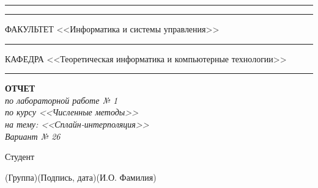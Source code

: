 \documentclass[14pt, russian]{scrartcl}
\begin{document}
\begin{titlepage}
	\vspace{-2pt}
	\hspace{-34.5pt}\rule{\textwidth}{2.5pt}

	\vspace*{-20.3pt}
	\hspace{-34.5pt}\rule{\textwidth}{0.4pt}

	\vspace{0.5ex}
	\noindent \small ФАКУЛЬТЕТ\hspace{80pt} <<Информатика и системы управления>>

	\vspace*{-16pt}
	\hspace{35pt}\rule{0.855\textwidth}{0.4pt}

	\vspace{0.5ex}
	\noindent \small КАФЕДРА\hspace{50pt} <<Теоретическая информатика и компьютерные технологии>>

	\vspace*{-16pt}
	\hspace{25pt}\rule{0.875\textwidth}{0.4pt}


	\vspace{3em}

	\begin{center}
		\textbf{ОТЧЕТ} \\\textit{по лабораторной работе № 1\\по курсу <<Численные методы>>\\на тему: <<Сплайн-интерполяция>>\\Вариант № 26} \\
	\end{center}

	\vspace{\fill}


	\newlength{\ML}

	\noindent Студент \underline{} \hfill \underline{ \hspace{4cm}}\quad

	\vspace{-2.1ex}
	\noindent\hspace{9ex}\scriptsize{(Группа)}\normalsize\hspace{170pt}\hspace{2ex}\scriptsize{(Подпись, дата)}\normalsize\hspace{30pt}\hspace{6ex}\scriptsize{(И.О. Фамилия)}\normalsize


\end{titlepage}
\end{document}
